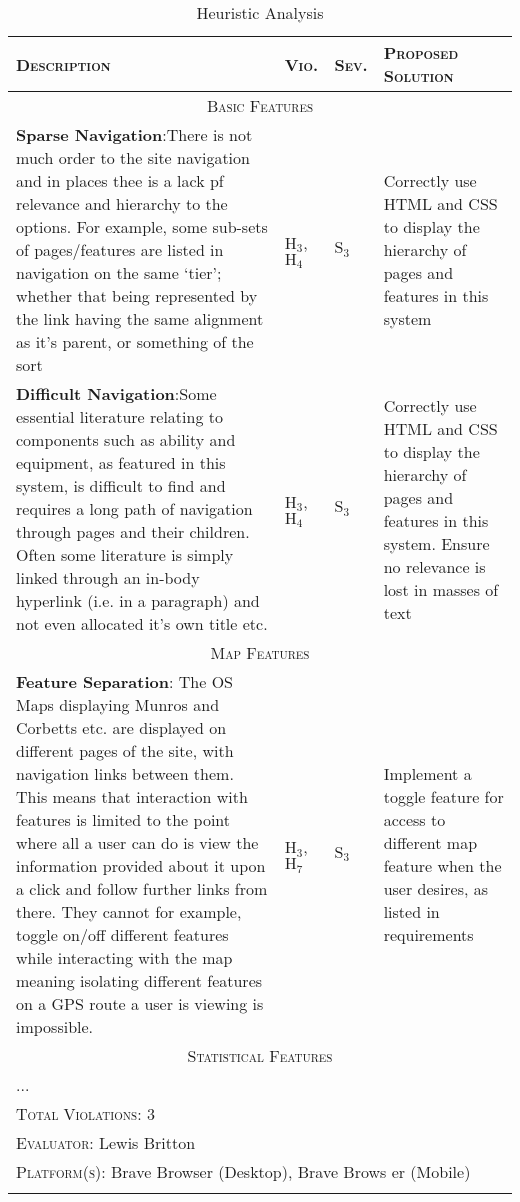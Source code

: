 \documentclass[11pt, english]{article}
\begin{document}
	\begin{center}
                \scriptsize
        	\begin{longtable}{p{7.5cm}p{0.5cm}p{0.5cm}p{4cm}}
                \textsc{Description} & \textsc{Vio.} & \textsc{Sev.} & \textsc{Proposed Solution}\\
                \hline
		\hline
		\multicolumn{4}{c}{\textsc{Basic Features}}\\
		\hline
			\textbf{Sparse Navigation}:\newline There is not much order to the site navigation and in places thee is a lack pf relevance and hierarchy to the options. For example, some sub-sets of pages/features are listed in navigation on the same `tier'; whether that being represented by the link having the same alignment as it's parent, or something of the sort & $\mathrm{H_{3}}$, $\mathrm{H_{4}}$ & $\mathrm{S_{3}}$ & Correctly use HTML and CSS to display the hierarchy of pages and features in this system\\
			\textbf{Difficult Navigation}:\newline Some essential literature relating to components such as ability and equipment, as featured in this system, is difficult to find and requires a long path of navigation through pages and their children. Often some literature is simply linked through an in-body hyperlink (i.e. in a paragraph) and not even allocated it's own title etc. & $\mathrm{H_{3}}$, $\mathrm{H_{4}}$ & $\mathrm{S_{3}}$ & Correctly use HTML and CSS to display the hierarchy of pages and features in this system. Ensure no relevance is lost in masses of text\\
		\hline
		\multicolumn{4}{c}{\textsc{Map Features}}\\
		\hline
			\textbf{Feature Separation}: The OS Maps displaying Munros and Corbetts etc. are displayed on different pages of the site, with navigation links between them. This means that interaction with features is limited to the point where all a user can do is view the information provided about it upon a click and follow further links from there. They cannot for example, toggle on/off different features while interacting with the map meaning isolating different features on a GPS route a user is viewing is impossible. & $\mathrm{H_{3}}$, $\mathrm{H_{7}}$ & $\mathrm{S_{3}}$ & Implement a toggle feature for access to different map feature when the user desires, as listed in requirements\\
		\hline
		\multicolumn{4}{c}{\textsc{Statistical Features}}\\
		\hline
		...\\
		\hline
		\hline
                \multicolumn{4}{l}{\textsc{Total Violations}: 3}\\
                \multicolumn{4}{l}{\textsc{Evaluator}: Lewis Britton}\\
                \multicolumn{4}{l}{\textsc{Platform(s)}: Brave Browser (Desktop), Brave Brows
er (Mobile)}\\
                \hline
                \caption{Heuristic Analysis}
        \end{longtable}
        \end{center}
\end{document}
